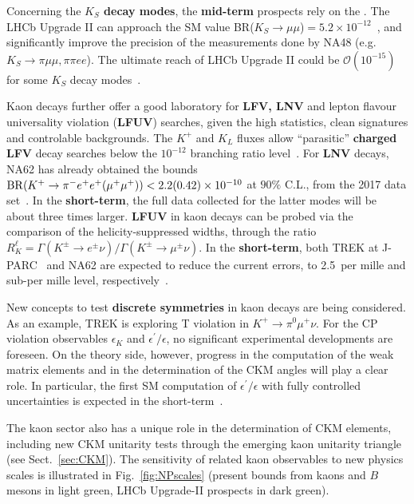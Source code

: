 Concerning the \textbf{$K_S$ decay modes}, the {\bf mid-term} prospects rely on the \HLLHC. 
The LHCb Upgrade II can approach the SM value 
BR($K_S \to \mu \mu$)$=5.2 \times 10^{-12}$~\cite{Cirigliano:2011ny}, and significantly improve the precision of the measurements done by NA48 (e.g.  $K_S \to \pi \mu \mu, \pi \pi e e$). The ultimate reach of LHCb Upgrade II could be $\mathcal{O}(10^{-15})$ for some $K_S$  decay modes~\cite{SozziESPP19}.  

Kaon decays further offer a good laboratory for \textbf{LFV, LNV} and lepton flavour universality violation (\textbf{LFUV}) searches, given
the high statistics, clean signatures and controlable backgrounds.
The $K^+$ and $K_L$ fluxes allow ``parasitic'' \textbf{charged LFV} decay searches below the $10^{-12}$ branching ratio level~\cite{SozziESPP19}.  For \textbf{LNV} decays, 
NA62 has already obtained the
bounds ${\rm BR}(K^+ \to \pi^- e^+e^+ (\mu^+\mu^+))<2.2(0.42)\times 10^{-10}$ 
at $90\%$ C.L.,  
from the 2017 data set~\cite{CortinaGil:2019dnd}.
In the {\bf short-term}, the full data collected for the latter modes will be about three times larger.  
{\bf LFUV} in kaon decays can be probed via the comparison of the helicity-suppressed widths, 
through the ratio 
$R_K^\ell = \Gamma (K^\pm \to e^\pm \nu)/\Gamma (K^\pm \to \mu^\pm\nu)$. 
In the {\bf short-term}, 
both TREK at J-PARC~\cite{JPARC_TREK} and NA62 are expected to reduce the current errors, 
 to 2.5~per mille and sub-per mille level, respectively~\cite{SozziESPP19,NA62:Lazzeroni}. 


New concepts to test {\bf discrete symmetries}
in kaon decays are being considered. 
As an example, TREK is  
exploring T violation in 
$K^+ \to \pi^0 \mu^+ \nu$. 
For the CP violation observables $\epsilon_K$ and $\epsilon^\prime/\epsilon$, no significant experimental developments are foreseen. 
On the theory side, however, progress in the computation of  the weak matrix elements and in the determination of the CKM angles will play a clear role. 
In particular, 
the first SM computation of $\epsilon^\prime/\epsilon$ with fully controlled uncertainties is expected in the short-term~\cite{Kelly:2019yxg}. 

The kaon sector also has a unique role in the determination of CKM elements, 
including new CKM unitarity tests through the emerging kaon unitarity triangle~\cite{Lehner:2015jga} (see Sect.~\ref{sec:CKM}). The sensitivity of related kaon observables to new physics  scales  is illustrated in Fig.~\ref{fig:NPscales} (present bounds from kaons and $B$ mesons in light green, LHCb Upgrade-II prospects in dark green).  

